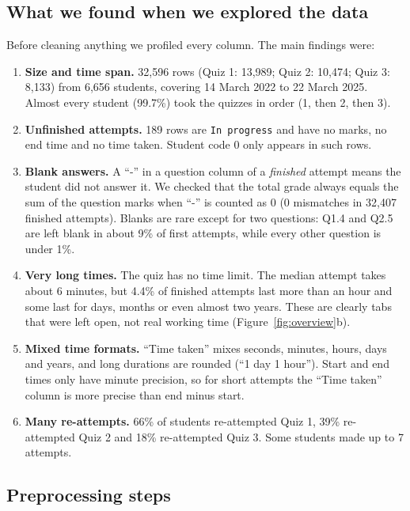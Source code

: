 \documentclass[11pt,a4paper]{article}
\begin{document}
\subsection{What we found when we explored the data}

Before cleaning anything we profiled every column. The main findings were:

\begin{enumerate}
  \item \textbf{Size and time span.} 32,596 rows (Quiz 1: 13,989; Quiz 2:
        10,474; Quiz 3: 8,133) from 6,656 students, covering 14 March 2022 to
        22 March 2025. Almost every student (99.7\%) took the quizzes in order
        (1, then 2, then 3).
  \item \textbf{Unfinished attempts.} 189 rows are \texttt{In progress} and have
        no marks, no end time and no time taken. Student code 0 only appears in
        such rows.
  \item \textbf{Blank answers.} A ``-'' in a question column of a
        \emph{finished} attempt means the student did not answer it. We checked
        that the total grade always equals the sum of the question marks when
        ``-'' is counted as 0 (0 mismatches in 32,407 finished attempts).
        Blanks are rare except for two questions: Q1.4 and Q2.5 are left blank
        in about 9\% of first attempts, while every other question is under 1\%.
  \item \textbf{Very long times.} The quiz has no time limit. The median attempt
        takes about 6 minutes, but 4.4\% of finished attempts last more than an
        hour and some last for days, months or even almost two years. These are
        clearly tabs that were left open, not real working time
        (Figure~\ref{fig:overview}b).
  \item \textbf{Mixed time formats.} ``Time taken'' mixes seconds, minutes,
        hours, days and years, and long durations are rounded (``1 day 1
        hour''). Start and end times only have minute precision, so for short
        attempts the ``Time taken'' column is more precise than end minus start.
  \item \textbf{Many re-attempts.} 66\% of students re-attempted Quiz 1, 39\%
        re-attempted Quiz 2 and 18\% re-attempted Quiz 3. Some students made up
        to 7 attempts.
\end{enumerate}

\subsection{Preprocessing steps}
\end{document}
